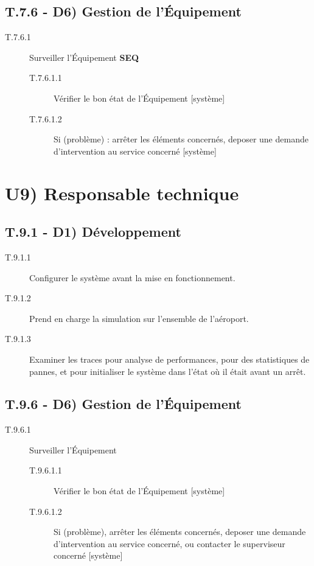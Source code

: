 	\subsection*{T.7.6 - D6) Gestion de l'Équipement}
	\begin{description}
		\item[T.7.6.1] Surveiller l'Équipement \textbf{SEQ}
		\begin{description}
			\item[T.7.6.1.1] Vérifier le bon état de l'Équipement [système]
			\item[T.7.6.1.2] Si (problème) : arrêter les éléments concernés, deposer une demande d'intervention au service concerné [système]
		\end{description}
	\end{description}

\section*{U9) Responsable technique}

	\subsection*{T.9.1 - D1) Développement}
	\begin{description}
		\item[T.9.1.1] Configurer le système avant la mise en fonctionnement.
		\item[T.9.1.2] Prend en charge la simulation sur l'ensemble de l'aéroport.
		\item[T.9.1.3] Examiner les traces pour analyse de performances, pour des statistiques de pannes, et pour initialiser le système dans l'état où il était avant un arrêt.
	\end{description}
	
	\subsection*{T.9.6 - D6) Gestion de l'Équipement}
	\begin{description}
		\item[T.9.6.1] Surveiller l'Équipement
		\begin{description}
			\item[T.9.6.1.1] Vérifier le bon état de l'Équipement [système]
			\item[T.9.6.1.2] Si (problème), arrêter les éléments concernés, deposer une demande d'intervention au service concerné, ou contacter le superviseur concerné [système]
		\end{description}
	\end{description}


